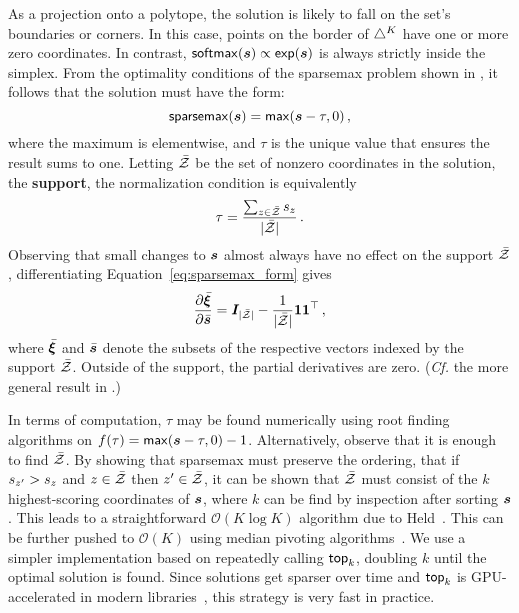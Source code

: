 As a projection onto a polytope, the solution is likely to fall on the
set's boundaries or corners. In this case, points on the border of
$\simplex^K$ have one or more zero coordinates. In contrast, $\softmax(\s)
    \propto \exp(\s)$ is always strictly inside the simplex.
From the optimality conditions of the sparsemax problem shown in ,
it follows that the solution must have the form:
%
\begin{equation}\label{eq:sparsemax_form}
    \sparsemax(\s) = \max(\s - \tau, 0)\,,
\end{equation}
%
where the maximum is elementwise, and $\tau$ is the unique value that
ensures the result sums to one.
Letting $\bar{\ZZ}$ be the set of nonzero coordinates in the solution, \ie the \textbf{support},
the normalization condition is equivalently
\begin{equation}
    \tau = \frac{\sum_{z \in \bar{\ZZ}} \ss_z}{|\bar{\ZZ}|}\,.
\end{equation}
Observing that small changes to $\s$ almost always have no effect on the support
$\bar{\ZZ}$, differentiating Equation~\ref{eq:sparsemax_form} gives
\begin{equation}
    \pfrac{\bar{\pv}}{\bar{\s}} = \bm{I}_{|\bar{\ZZ}|} - \frac{1}{|\bar{\ZZ}|}
    \bm{11}^\top\,,
\end{equation}
where $\bar{\pv}$ and ${\bar{\s}}$ denote the subsets of the respective vectors
indexed by the support $\bar{\ZZ}$. Outside of the support, the partial
derivatives are zero. (\emph{Cf.} the more general result in \citet[Proposition
    2]{entmax}.)

In terms of computation, $\tau$ may be found numerically using root finding
algorithms on $f(\tau) = \max(\s - \tau, 0) - 1$.
Alternatively, observe that it is enough to find $\bar{\ZZ}$. By showing that
sparsemax must preserve the ordering, \ie that if $\ss_{z'} > \ss_z$ and $z \in
    \bar{\ZZ}$ then $z' \in \bar{\ZZ}$, it can be shown that $\bar{\ZZ}$ must
consist of the $k$ highest-scoring coordinates of $\s$, where $k$ can be find by
inspection after sorting $\s$. This leads to a straightforward $\mathcal{O}(K
    \log K)$ algorithm due to Held~\citep[pp.~16--17]{Held1974}. This can be further pushed to
$\mathcal{O}(K)$ using median pivoting algorithms~\citep{Condat2016, entmax}. We use
a simpler implementation based on repeatedly calling $\topk$,
doubling $k$ until the optimal solution is found. Since solutions get sparser
over time and $\topk$ is GPU-accelerated
in modern libraries~\citep{pytorch}, this strategy is very fast in practice.

